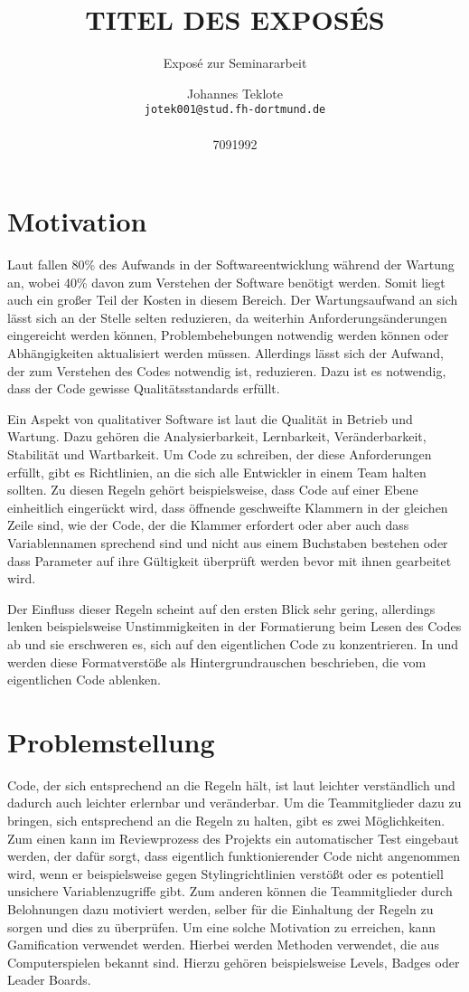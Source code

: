 \documentclass[fontsize=11pt, paper=a4, parskip=half]{scrartcl}
\title{
	TITEL DES EXPOSÉS
}
\subtitle{Exposé zur Seminararbeit}
\author{
	Johannes Teklote
	\\
	\texttt{jotek001@stud.fh-dortmund.de}
	\\ \\
	{7091992}
}
\begin{document}
\maketitle

\section{Motivation}
Laut \cite{Balzert2009} fallen 80\% des Aufwands in der Softwareentwicklung während der Wartung an, wobei 40\% davon zum Verstehen der Software benötigt werden.
Somit liegt auch ein großer Teil der Kosten in diesem Bereich.
Der Wartungsaufwand an sich lässt sich an der Stelle selten reduzieren, da weiterhin Anforderungsänderungen eingereicht werden können, Problembehebungen notwendig werden können oder Abhängigkeiten aktualisiert werden müssen.
Allerdings lässt sich der Aufwand, der zum Verstehen des Codes notwendig ist, reduzieren.
Dazu ist es notwendig, dass der Code gewisse Qualitätsstandards erfüllt.

Ein Aspekt von qualitativer Software ist laut \cite{ISO-25010} die Qualität in Betrieb und Wartung.
Dazu gehören die Analysierbarkeit, Lernbarkeit, Veränderbarkeit, Stabilität und Wartbarkeit.
Um Code zu schreiben, der diese Anforderungen erfüllt, gibt es Richtlinien, an die sich alle Entwickler in einem Team halten sollten.
Zu diesen Regeln gehört beispielsweise, dass Code auf einer Ebene einheitlich eingerückt wird, dass öffnende geschweifte Klammern in der gleichen Zeile sind, wie der Code, der die Klammer erfordert oder aber auch dass Variablennamen sprechend sind und nicht aus einem Buchstaben bestehen oder dass Parameter auf ihre Gültigkeit überprüft werden bevor mit ihnen gearbeitet wird. 

Der Einfluss dieser Regeln scheint auf den ersten Blick sehr gering, allerdings lenken beispielsweise Unstimmigkeiten in der Formatierung beim Lesen des Codes ab und sie erschweren es, sich auf den eigentlichen Code zu konzentrieren.
In \cite{PJ2015} und \cite{SP2011} werden diese Formatverstöße als Hintergrundrauschen beschrieben, die vom eigentlichen Code ablenken. 

\section{Problemstellung}
Code, der sich entsprechend an die Regeln hält, ist laut \cite{PJ2015} leichter verständlich und dadurch auch leichter erlernbar und veränderbar.
Um die Teammitglieder dazu zu bringen, sich entsprechend an die Regeln zu halten, gibt es zwei Möglichkeiten.
Zum einen kann im Reviewprozess des Projekts ein automatischer Test eingebaut werden, der dafür sorgt, dass eigentlich funktionierender Code nicht angenommen wird, wenn er beispielsweise gegen Stylingrichtlinien verstößt oder es potentiell unsichere Variablenzugriffe gibt.
Zum anderen können die Teammitglieder durch Belohnungen dazu motiviert werden, selber für die Einhaltung der Regeln zu sorgen und dies zu überprüfen.
Um eine solche Motivation zu erreichen, kann Gamification verwendet werden.
Hierbei werden Methoden verwendet, die aus Computerspielen bekannt sind. Hierzu gehören beispielsweise Levels, Badges oder Leader Boards. 
\end{document}
